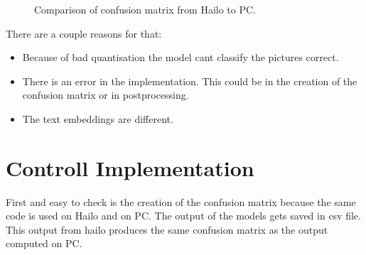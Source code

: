 \begin{figure}[!h]
    \centering
    \label{methods:fig:compareConfM}
    \caption{Comparison of confusion matrix from Hailo to PC.}
\end{figure}

There are a couple reasons for that:
\begin{itemize}
    \item Because of bad quantisation the model cant classify the pictures correct.
    \item There is an error in the implementation. This could be in the creation of the confusion matrix or in postprocessing.
    \item The text embeddings are different.
\end{itemize}

\section{Controll Implementation
    \label{scetion:methods:contimp}}
First and easy to check is the creation of the confusion matrix because the same code is used on Hailo and on PC.
The output of the models gets saved in csv file.
This output from hailo produces the same confusion matrix as the output computed on PC.

